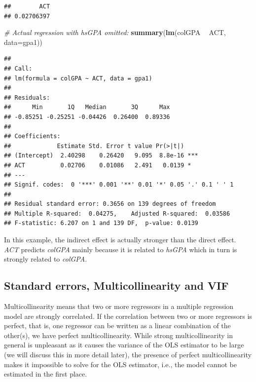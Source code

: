 \documentclass[]{book}
\newenvironment{Shaded}{\begin{snugshade}}{\end{snugshade}}
\newcommand{\CommentTok}[1]{\textcolor[rgb]{0.56,0.35,0.01}{\textit{#1}}}
\newcommand{\DataTypeTok}[1]{\textcolor[rgb]{0.13,0.29,0.53}{#1}}
\newcommand{\KeywordTok}[1]{\textcolor[rgb]{0.13,0.29,0.53}{\textbf{#1}}}
\newcommand{\NormalTok}[1]{#1}
\newcommand{\OperatorTok}[1]{\textcolor[rgb]{0.81,0.36,0.00}{\textbf{#1}}}
\newcommand{\StringTok}[1]{\textcolor[rgb]{0.31,0.60,0.02}{#1}}
\begin{document}
\begin{verbatim}
##        ACT 
## 0.02706397
\end{verbatim}

\begin{Shaded}
\begin{Highlighting}[]
\CommentTok{# Actual regression with hsGPA omitted:}
\KeywordTok{summary}\NormalTok{(}\KeywordTok{lm}\NormalTok{(colGPA }\OperatorTok{~}\StringTok{ }\NormalTok{ACT, }\DataTypeTok{data=}\NormalTok{gpa1))}
\end{Highlighting}
\end{Shaded}

\begin{verbatim}
## 
## Call:
## lm(formula = colGPA ~ ACT, data = gpa1)
## 
## Residuals:
##      Min       1Q   Median       3Q      Max 
## -0.85251 -0.25251 -0.04426  0.26400  0.89336 
## 
## Coefficients:
##             Estimate Std. Error t value Pr(>|t|)    
## (Intercept)  2.40298    0.26420   9.095  8.8e-16 ***
## ACT          0.02706    0.01086   2.491   0.0139 *  
## ---
## Signif. codes:  0 '***' 0.001 '**' 0.01 '*' 0.05 '.' 0.1 ' ' 1
## 
## Residual standard error: 0.3656 on 139 degrees of freedom
## Multiple R-squared:  0.04275,    Adjusted R-squared:  0.03586 
## F-statistic: 6.207 on 1 and 139 DF,  p-value: 0.0139
\end{verbatim}

In this example, the indirect effect is actually stronger than the
direct effect. \emph{ACT} predicts \emph{colGPA} mainly because it is
related to \emph{hsGPA} which in turn is strongly related to
\emph{colGPA}.

\hypertarget{standard-errors-multicollinearity-and-vif}{%
\subsection{Standard errors, Multicollinearity and
VIF}\label{standard-errors-multicollinearity-and-vif}}

Multicollinearity means that two or more regressors in a multiple
regression model are strongly correlated. If the correlation between two
or more regressors is perfect, that is, one regressor can be written as
a linear combination of the other(s), we have perfect multicollinearity.
While strong multicollinearity in general is unpleasant as it causes the
variance of the OLS estimator to be large (we will discuss this in more
detail later), the presence of perfect multicollinearity makes it
impossible to solve for the OLS estimator, i.e., the model cannot be
estimated in the first place.
\end{document}
